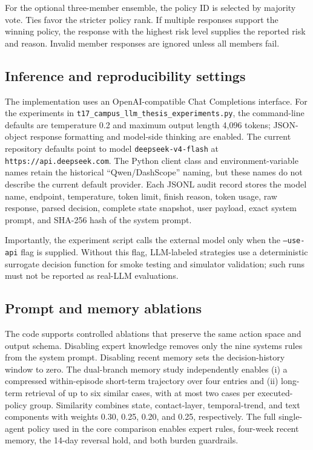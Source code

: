 For the optional three-member ensemble, the policy ID is selected by majority
vote.  Ties favor the stricter policy rank.  If multiple responses support the
winning policy, the response with the highest risk level supplies the reported
risk and reason.  Invalid member responses are ignored unless all members fail.

\subsection{Inference and reproducibility settings}

The implementation uses an OpenAI-compatible Chat Completions interface.  For
the experiments in \texttt{t17\_campus\_llm\_thesis\_experiments.py}, the
command-line defaults are temperature 0.2 and maximum output length 4,096
tokens; JSON-object response formatting and model-side thinking are enabled.
The current repository defaults point to model
\texttt{deepseek-v4-flash} at \texttt{https://api.deepseek.com}.  The Python
client class and environment-variable names retain the historical
``Qwen/DashScope'' naming, but these names do not describe the current default
provider.  Each JSONL audit record stores the model name, endpoint, temperature,
token limit, finish reason, token usage, raw response, parsed decision, complete
state snapshot, user payload, exact system prompt, and SHA-256 hash of the system
prompt.

Importantly, the experiment script calls the external model only when the
\texttt{--use-api} flag is supplied.  Without this flag, LLM-labeled strategies
use a deterministic surrogate decision function for smoke testing and simulator
validation; such runs must not be reported as real-LLM evaluations.

\subsection{Prompt and memory ablations}

The code supports controlled ablations that preserve the same action space and
output schema.  Disabling expert knowledge removes only the nine systems rules
from the system prompt.  Disabling recent memory sets the decision-history
window to zero.  The dual-branch memory study independently enables (i) a
compressed within-episode short-term trajectory over four entries and (ii)
long-term retrieval of up to six similar cases, with at most two cases per
executed-policy group.  Similarity combines state, contact-layer, temporal-trend,
and text components with weights 0.30, 0.25, 0.20, and 0.25, respectively.  The
full single-agent policy used in the core comparison enables expert rules,
four-week recent memory, the 14-day reversal hold, and both burden guardrails.
